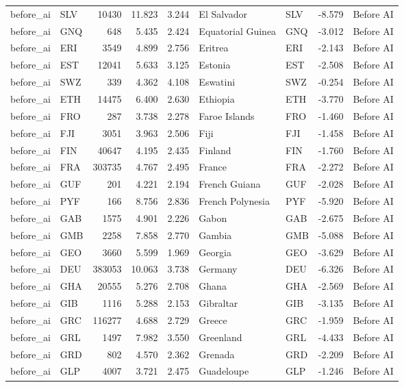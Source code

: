 \begin{tabular}{llrrrllrl}
before\_ai & SLV & 10430 & 11.823 & 3.244 & El Salvador & SLV & -8.579 & Before AI \\
before\_ai & GNQ & 648 & 5.435 & 2.424 & Equatorial Guinea & GNQ & -3.012 & Before AI \\
before\_ai & ERI & 3549 & 4.899 & 2.756 & Eritrea & ERI & -2.143 & Before AI \\
before\_ai & EST & 12041 & 5.633 & 3.125 & Estonia & EST & -2.508 & Before AI \\
before\_ai & SWZ & 339 & 4.362 & 4.108 & Eswatini & SWZ & -0.254 & Before AI \\
before\_ai & ETH & 14475 & 6.400 & 2.630 & Ethiopia & ETH & -3.770 & Before AI \\
before\_ai & FRO & 287 & 3.738 & 2.278 & Faroe Islands & FRO & -1.460 & Before AI \\
before\_ai & FJI & 3051 & 3.963 & 2.506 & Fiji & FJI & -1.458 & Before AI \\
before\_ai & FIN & 40647 & 4.195 & 2.435 & Finland & FIN & -1.760 & Before AI \\
before\_ai & FRA & 303735 & 4.767 & 2.495 & France & FRA & -2.272 & Before AI \\
before\_ai & GUF & 201 & 4.221 & 2.194 & French Guiana & GUF & -2.028 & Before AI \\
before\_ai & PYF & 166 & 8.756 & 2.836 & French Polynesia & PYF & -5.920 & Before AI \\
before\_ai & GAB & 1575 & 4.901 & 2.226 & Gabon & GAB & -2.675 & Before AI \\
before\_ai & GMB & 2258 & 7.858 & 2.770 & Gambia & GMB & -5.088 & Before AI \\
before\_ai & GEO & 3660 & 5.599 & 1.969 & Georgia & GEO & -3.629 & Before AI \\
before\_ai & DEU & 383053 & 10.063 & 3.738 & Germany & DEU & -6.326 & Before AI \\
before\_ai & GHA & 20555 & 5.276 & 2.708 & Ghana & GHA & -2.569 & Before AI \\
before\_ai & GIB & 1116 & 5.288 & 2.153 & Gibraltar & GIB & -3.135 & Before AI \\
before\_ai & GRC & 116277 & 4.688 & 2.729 & Greece & GRC & -1.959 & Before AI \\
before\_ai & GRL & 1497 & 7.982 & 3.550 & Greenland & GRL & -4.433 & Before AI \\
before\_ai & GRD & 802 & 4.570 & 2.362 & Grenada & GRD & -2.209 & Before AI \\
before\_ai & GLP & 4007 & 3.721 & 2.475 & Guadeloupe & GLP & -1.246 & Before AI \\

\end{tabular}
